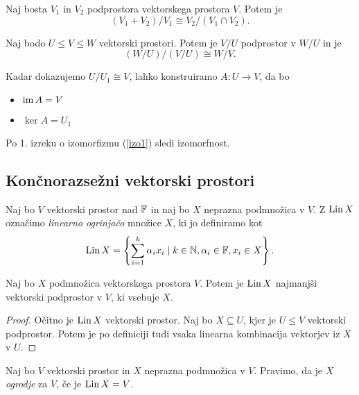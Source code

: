 \documentclass[12pt, a4paper]{article}
\begin{document}
\begin{izrek}\label{izo2}
Naj bosta $V_1$ in $V_2$ podprostora vektorskega prostora $V$. Potem je
\[
(V_1+V_2)/V_1\cong V_2/(V_1\cap V_2).
\]
\end{izrek}
\begin{izrek}\label{izo3}
Naj bodo $U\leq V\leq W$ vektorski prostori. Potem je $V/U$ podprostor v $W/U$ in je
\[
(W/U)/(V/U)\cong W/V.
\]
\end{izrek}

\begin{opomba}
Kadar dokazujemo $U/U_1\cong V$, lahko konstruiramo $A\colon U\to V$, da bo

\begin{itemize}
\item $\operatorname{im} A=V$
\item $\ker A=U_1$
\end{itemize}

Po 1. izreku o izomorfizmu (\ref{izo1}) sledi izomorfnost.
\end{opomba}

\newpage

\subsection{Končnorazsežni vektorski prostori}

\begin{definicija}
Naj bo $V$ vektorski prostor nad $\mathbb{F}$ in naj bo $X$ neprazna podmnožica v $V$. Z $\operatorname{Lin} X$ označimo \emph{linearno ogrinjačo} množice $X$, ki jo definiramo kot
\[
\operatorname{Lin} X=\left\{\sum_{i=1}^k \alpha_ix_i\mid k\in\mathbb{N},\alpha_i\in\mathbb{F},x_i\in X\right\}.
\]
\end{definicija}

\begin{trditev}
Naj bo $X$ podmnožica vektorskega prostora $V$. Potem je $\operatorname{Lin} X$ najmanjši vektorski podprostor v $V$, ki vsebuje $X$.
\end{trditev}

\begin{proof}
Očitno je $\operatorname{Lin} X$ vektorski prostor. Naj bo $X\subseteq U$, kjer je $U\leq V$ vektorski podprostor. Potem je po definiciji tudi vsaka linearna kombinacija vektorjev iz $X$ v $U$.
\end{proof}

\begin{definicija}
Naj bo $V$ vektorski prostor in $X$ neprazna podmnožica v $V$. Pravimo, da je $X$ \emph{ogrodje} za $V$, če je $\operatorname{Lin} X=V$.
\end{definicija}
\end{document}
